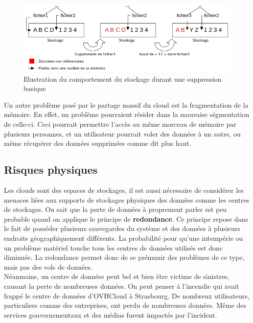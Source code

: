 \documentclass[a4paper, 12pt]{article}
\begin{document}
\begin{spacing}{1.1}
      \begin{figure}[h]
        \centering
        \includegraphics[scale=.6]{img/schema_memoire.png}
        \caption{Illustration du comportement du stockage durant une suppression
        basique}
      \end{figure}

      Un autre problème posé par le partage massif du cloud est la fragmentation
      de la mémoire. En effet, un problème pourraient résider dans la mauvaise
      ségmentation de celle-ci. Ceci pourrait permettre l'accès au même
      morceau de mémoire par plusieurs personnes, et un utilisateur pourrait
      voler des données à un autre, ou même récupérer des données supprimées
      comme dit plus haut.

    \subsection{Risques physiques}
      Les clouds sont des espaces de stockages, il est aussi nécessaire de
      considérer les menaces liées aux supports de stockages physiques des
      données comme les centres de stockages. On sait que la perte de données
      à proprement parler est peu probable quand on applique le principe de
      \textbf{redondance}. Ce principe repose dans le fait de posséder plusieurs
      sauvegardes du système et des données à plusieurs endroits
      géographiquement différents. La probabilité pour qu'une intempérie ou un
      problème matériel touche tous les centres de données utilisés est donc
      diminuée. La redondance permet donc de se prémunir des problèmes de ce
      type, mais pas des vols de données. \\

      Néanmoins, un centre de données peut bel et bien être victime de
      sinistres, causant la perte de nombreuses données. On peut penser à
      l'incendie qui avait frappé le centre de données d'OVHCloud à Strasbourg.
      De nombreux utilisateurs, particuliers comme des entreprises, ont perdu de
      nombreuses données. Même des services gouvernementaux et des médias furent
      impactés par l'incident.


\end{spacing}
\end{document}
